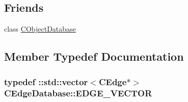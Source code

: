 \subsection*{Friends}
\begin{DoxyCompactItemize}
\item 
class \hyperlink{class_c_edge_database_a8451ee9e81bc51a04afb10dc6ee7e07e}{C\+Object\+Database}
\end{DoxyCompactItemize}


\subsection{Member Typedef Documentation}
\hypertarget{class_c_edge_database_a08466635640bd52b2f5a31418c7fc9e6}{}
\subsubsection[{E\+D\+G\+E\+\_\+\+V\+E\+C\+T\+O\+R}]{\setlength{\rightskip}{0pt plus 5cm}typedef \+::std\+::vector$<${\bf C\+Edge}$\ast$$>$ {\bf C\+Edge\+Database\+::\+E\+D\+G\+E\+\_\+\+V\+E\+C\+T\+O\+R}}\label{class_c_edge_database_a08466635640bd52b2f5a31418c7fc9e6}


